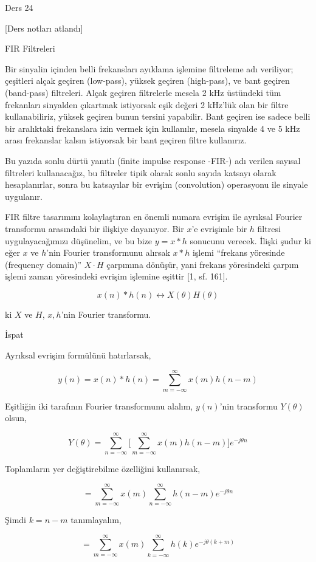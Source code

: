 \documentclass[12pt,fleqn]{article}\usepackage{../../common}
\begin{document}
Ders 24

[Ders notları atlandı]

FIR Filtreleri

Bir sinyalin içinden belli frekansları ayıklama işlemine filtreleme adı
veriliyor; çeşitleri alçak geçiren (low-pass), yüksek geçiren (high-pass),
ve bant geçiren (band-pass) filtreleri. Alçak geçiren filtrelerle mesela 2
kHz üstündeki tüm frekanları sinyalden çıkartmak istiyorsak eşik değeri 2
kHz'lük olan bir filtre kullanabiliriz, yüksek geçiren bunun tersini
yapabilir. Bant geçiren ise sadece belli bir aralıktaki frekanslara izin
vermek için kullanılır, mesela sinyalde 4 ve 5 kHz arası frekanslar kalsın
istiyorsak bir bant geçiren filtre kullanırız.

Bu yazıda sonlu dürtü yanıtlı (finite impulse response -FIR-) adı verilen
sayısal filtreleri kullanacağız, bu filtreler tipik olarak sonlu sayıda
katsayı olarak hesaplanırlar, sonra bu katsayılar bir evrişim
(convolution) operasyonu ile sinyale uygulanır.

FIR filtre tasarımını kolaylaştıran en önemli numara evrişim ile ayrıksal
Fourier transformu arasındaki bir ilişkiye dayanıyor. Bir $x$'e evrişimle
bir $h$ filtresi uygulayacağımızı düşünelim, ve bu bize $y = x * h$
sonucunu verecek. İlişki şudur ki eğer $x$ ve $h$'nin Fourier transformunu
alırsak $x * h$ işlemi ``frekans yöresinde (frequency domain)'' $X \cdot H$
çarpımına dönüşür, yani frekans yöresindeki çarpım işlemi zaman yöresindeki
evrişim işlemine eşittir [1, sf. 161].

$$ x(n) * h(n) \leftrightarrow X(\theta)H(\theta)$$

ki $X$ ve $H$, $x,h$'nin Fourier transformu.

İspat

Ayrıksal evrişim formülünü hatırlarsak,

$$ y(n) = x(n) * h(n) = \sum _{m=-\infty}^{\infty} x(m) h(n-m) $$

Eşitliğin iki tarafının Fourier transformunu alalım, $y(n)$'nin transformu
$Y(\theta)$ olsun,

$$  
Y(\theta) = \sum_{n=-\infty}^{\infty} \bigg[
\sum_{m=-\infty}^{\infty} x(m) h(n-m)
\bigg] e^{-j\theta n}
$$

Toplamların yer değiştirebilme özelliğini kullanırsak, 

$$ 
= \sum_{m=-\infty}^{\infty} x(m)  \sum_{n=-\infty}^{\infty} h(n-m)  e^{-j\theta n}
$$

Şimdi $k = n-m$ tanımlayalım, 

$$  
= \sum_{m=-\infty}^{\infty} x(m)  \sum_{k=-\infty}^{\infty} h(k)  e^{-j\theta (k+m)}
$$
\end{document}
